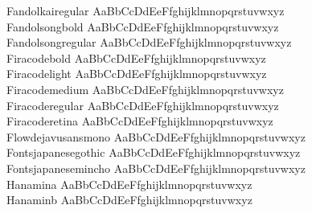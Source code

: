 \begin{tabbing}
Fandolkairegular \> { AaBbCcDdEeFfghijklmnopqrstuvwxyz} \\
Fandolsongbold \> { AaBbCcDdEeFfghijklmnopqrstuvwxyz} \\
Fandolsongregular \> { AaBbCcDdEeFfghijklmnopqrstuvwxyz} \\
Firacodebold \> { AaBbCcDdEeFfghijklmnopqrstuvwxyz} \\
Firacodelight \> { AaBbCcDdEeFfghijklmnopqrstuvwxyz} \\
Firacodemedium \> { AaBbCcDdEeFfghijklmnopqrstuvwxyz} \\
Firacoderegular \> { AaBbCcDdEeFfghijklmnopqrstuvwxyz} \\
Firacoderetina \> { AaBbCcDdEeFfghijklmnopqrstuvwxyz} \\
Flowdejavusansmono \> { AaBbCcDdEeFfghijklmnopqrstuvwxyz} \\
Fontsjapanesegothic \> { AaBbCcDdEeFfghijklmnopqrstuvwxyz} \\
Fontsjapanesemincho \> { AaBbCcDdEeFfghijklmnopqrstuvwxyz} \\
Hanamina \> { AaBbCcDdEeFfghijklmnopqrstuvwxyz} \\
Hanaminb \> { AaBbCcDdEeFfghijklmnopqrstuvwxyz} \\

\end{tabbing}
